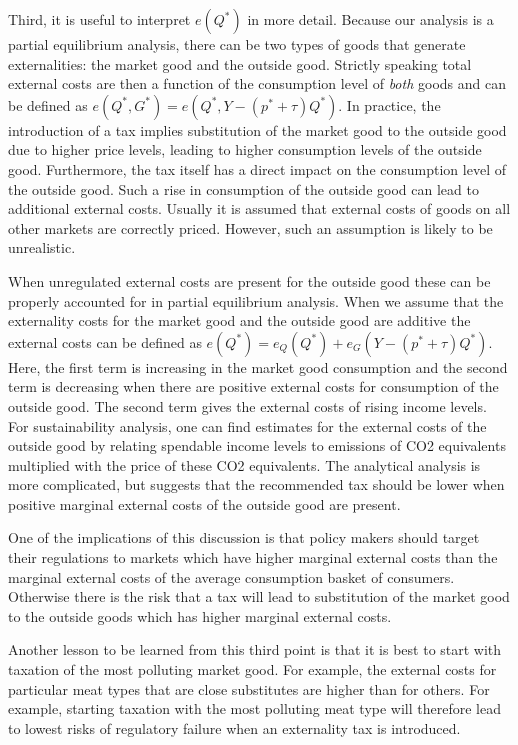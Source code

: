 \documentclass[
]{book}
\begin{document}
Third, it is useful to interpret \(e(Q^*)\) in more detail. Because our analysis is a partial equilibrium analysis, there can be two types of goods that generate externalities: the market good and the outside good. Strictly speaking total external costs are then a function of the consumption level of \emph{both} goods and can be defined as \(e(Q^*,G^* )=e(Q^*,Y-(p^*+\tau)Q^* )\). In practice, the introduction of a tax implies substitution of the market good to the outside good due to higher price levels, leading to higher consumption levels of the outside good. Furthermore, the tax itself has a direct impact on the consumption level of the outside good. Such a rise in consumption of the outside good can lead to additional external costs. Usually it is assumed that external costs of goods on all other markets are correctly priced. However, such an assumption is likely to be unrealistic.

When unregulated external costs are present for the outside good these can be properly accounted for in partial equilibrium analysis. When we assume that the externality costs for the market good and the outside good are additive the external costs can be defined as \(e(Q^* )=e_Q (Q^* )+e_G (Y-(p^*+\tau)Q^* )\). Here, the first term is increasing in the market good consumption and the second term is decreasing when there are positive external costs for consumption of the outside good. The second term gives the external costs of rising income levels. For sustainability analysis, one can find estimates for the external costs of the outside good by relating spendable income levels to emissions of CO2 equivalents multiplied with the price of these CO2 equivalents. The analytical analysis is more complicated, but suggests that the recommended tax should be lower when positive marginal external costs of the outside good are present.

One of the implications of this discussion is that policy makers should target their regulations to markets which have higher marginal external costs than the marginal external costs of the average consumption basket of consumers. Otherwise there is the risk that a tax will lead to substitution of the market good to the outside goods which has higher marginal external costs.

Another lesson to be learned from this third point is that it is best to start with taxation of the most polluting market good. For example, the external costs for particular meat types that are close substitutes are higher than for others. For example, starting taxation with the most polluting meat type will therefore lead to lowest risks of regulatory failure when an externality tax is introduced.
\end{document}
